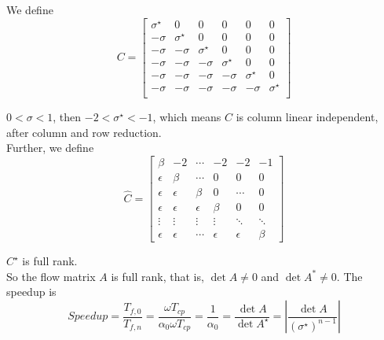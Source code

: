 We define
\begin{equation*}
{C = \left[ \begin{array}{cccccc}
{\sigma}^{\star} & 0 & 0 & 0 & 0 &0\\
-\sigma & {\sigma}^{\star} & 0 & 0 & 0 & 0 \\
-\sigma & -\sigma & {\sigma}^{\star} & 0 & 0 & 0 \\
-\sigma & -\sigma & -\sigma & {\sigma}^{\star} & 0 & 0\\
-\sigma & -\sigma & -\sigma & -\sigma & {\sigma}^{\star} & 0\\
-\sigma & -\sigma & -\sigma & -\sigma & -\sigma & {\sigma}^{\star}\\
\end{array} 
\right ]
}
\end{equation*}

$0 < \sigma < 1$, then $-2 < \sigma^{\star} < -1$, which means $C$ is column linear independent, after column and row reduction. \\
Further, we define
\begin{equation*}
{\hat{C} = \left[ \begin{array}{cccccc}
\beta & -2 & \cdots& -2 & -2 & -1\\
\epsilon & \beta & \cdots & 0 & 0 & 0 \\
\epsilon & \epsilon & \beta & 0 & \cdots & 0 \\
\epsilon & \epsilon & \epsilon & \beta & 0 & 0 \\
\vdots & \vdots & \vdots  &   \vdots & \ddots & \ddots\\
\epsilon & \epsilon & \cdots & \epsilon & \epsilon & \beta
\end{array} 
\right ]
}
\end{equation*}

$C^{\star}$ is full rank.\\
So the flow matrix $A$ is full rank, that is, $\det A \neq 0$ and $\det A^{*} \neq 0$.
The speedup is  
$$Speedup = \frac{T_{f, 0}}{T_{f, n}}= \frac{\omega T_{cp}}{\alpha_{0}\omega T_{cp}} = \frac{1}{\alpha_{0}} = \frac{\det A}{\det A^{\star}} = \left |\frac{\det A}{(\sigma^{\star})^{n-1}}\right|$$
\newpage 

